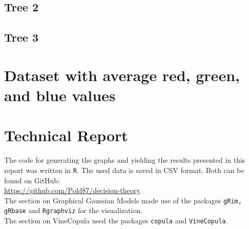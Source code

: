 \documentclass{article}
\begin{document}
\subsection{Tree 2}

\subsection{Tree 3}


\section{Dataset with average red, green, and blue values}
\begin{center}
\end{center}


\section{Technical Report}
\label{sec:technical}

The code for generating the graphs and yielding the results presented
in this report was written in \texttt{R}. The used data is saved in
CSV format. Both can be found on GitHub:\\
\noindent\url{https://github.com/Pold87/decision-theory}\\

The section on Graphical Gaussian Models made use of the packages
\texttt{gRim, gRbase} and \texttt{Rgraphviz} for the visualization.\\

The section on VineCopula used the packages \texttt{copula} and
\texttt{VineCopula}.
\end{document}
